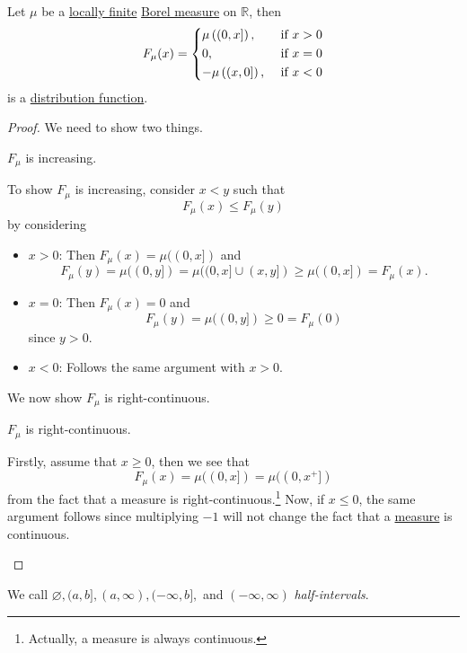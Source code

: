 \begin{lemma}
	Let \(\mu \) be a \hyperref[def:locally-finite]{locally finite} \hyperref[def:Borel-measure]{Borel measure} on
	\(\mathbb{R} \), then
	\[
		F_{\mu }(x) = \begin{dcases}
			\mu \left((0, x]\right),  & \text{ if } x > 0 \\
			0,                        & \text{ if } x = 0 \\
			-\mu \left((x, 0]\right), & \text{ if } x < 0
		\end{dcases}
	\]
	is a \hyperref[def:distribution-function]{distribution function}.
\end{lemma}
\begin{proof}
	We need to show two things.
	\begin{claim}
		\(F_\mu\) is increasing.
	\end{claim}
	\begin{explanation}
		To show \(F_\mu\) is increasing, consider \(x<y\) such that
		\[
			F_\mu (x) \leq F_\mu (y)
		\]
		by considering
		\begin{itemize}
			\item \(x>0\): Then \(F_\mu (x) = \mu ((0, x])\) and
			      \[
				      F_\mu (y) = \mu ((0, y]) = \mu ((0, x]\cup (x, y]) \geq \mu ((0, x]) = F_\mu (x).
			      \]
			\item \(x=0\): Then \(F_\mu (x) = 0\) and
			      \[
				      F_\mu (y) = \mu ((0, y])\geq 0 = F_\mu (0)
			      \]
			      since \(y>0\).
			\item \(x<0\): Follows the same argument with \(x>0\).
		\end{itemize}
	\end{explanation}

	We now show \(F_\mu \) is right-continuous.
	\begin{claim}
		\(F_\mu \) is right-continuous.
	\end{claim}
	\begin{explanation}
		Firstly, assume that \(x \geq 0\), then we see that
		\[
			F_\mu(x) = \mu ((0, x]) = \mu ((0, x^+])
		\]
		from the fact that a measure is right-continuous.\footnote{Actually, a measure is always continuous.} Now, if \(x\leq 0\),
		the same argument follows since multiplying \(-1\) will not change the fact that a \hyperref[def:measure]{measure} is continuous.
	\end{explanation}
\end{proof}

\begin{definition}\label{def:half-intervals}
	We call \(\varnothing , (a, b], (a, \infty ), (-\infty , b],\) and \((-\infty , \infty )\) \emph{half-intervals}.
\end{definition}

